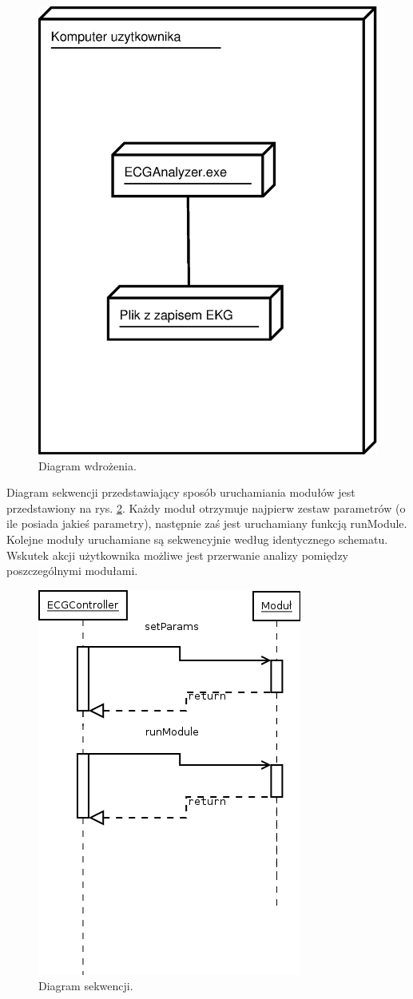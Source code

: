 \documentclass[a4paper, 11pt]{article}
\begin{document}
\begin{figure}[h!]
  \centering
  \includegraphics[width=0.5\linewidth]{include/deployment_diagram}
  \caption{Diagram wdrożenia.}
  \label{fig:deployment_diagram}
\end{figure}

Diagram sekwencji przedstawiający sposób uruchamiania modułów jest przedstawiony na rys. \ref{fig:sequence_diagram}. Każdy moduł otrzymuje najpierw zestaw parametrów (o ile posiada jakieś parametry), następnie zaś jest uruchamiany funkcją runModule. Kolejne moduły uruchamiane są sekwencyjnie według identycznego schematu. Wskutek akcji użytkownika możliwe jest przerwanie analizy pomiędzy poszczególnymi modułami.

\begin{figure}[h!]
  \centering
  \includegraphics[width=0.5\linewidth]{include/sequence_diagram}
  \caption{Diagram sekwencji.}
  \label{fig:sequence_diagram}
\end{figure}
\end{document}
